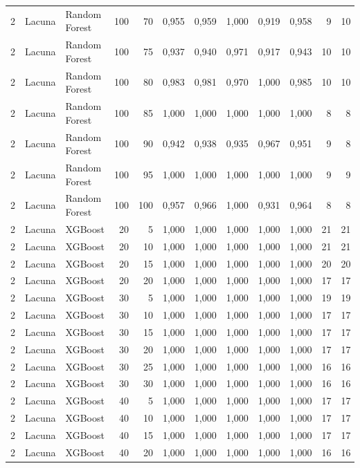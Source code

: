 \begin{longtable}{@{}rllrrrrrrrrr@{}}
2 & Lacuna & Random Forest & 100 & 70 & 0,955 & 0,959 & 1,000 & 0,919 & 0,958 & 9 & 10 \\
2 & Lacuna & Random Forest & 100 & 75 & 0,937 & 0,940 & 0,971 & 0,917 & 0,943 & 10 & 10 \\
2 & Lacuna & Random Forest & 100 & 80 & 0,983 & 0,981 & 0,970 & 1,000 & 0,985 & 10 & 10 \\
2 & Lacuna & Random Forest & 100 & 85 & 1,000 & 1,000 & 1,000 & 1,000 & 1,000 & 8 & 8 \\
2 & Lacuna & Random Forest & 100 & 90 & 0,942 & 0,938 & 0,935 & 0,967 & 0,951 & 9 & 8 \\
2 & Lacuna & Random Forest & 100 & 95 & 1,000 & 1,000 & 1,000 & 1,000 & 1,000 & 9 & 9 \\
2 & Lacuna & Random Forest & 100 & 100 & 0,957 & 0,966 & 1,000 & 0,931 & 0,964 & 8 & 8 \\
2 & Lacuna & XGBoost & 20 & 5 & 1,000 & 1,000 & 1,000 & 1,000 & 1,000 & 21 & 21 \\
2 & Lacuna & XGBoost & 20 & 10 & 1,000 & 1,000 & 1,000 & 1,000 & 1,000 & 21 & 21 \\
2 & Lacuna & XGBoost & 20 & 15 & 1,000 & 1,000 & 1,000 & 1,000 & 1,000 & 20 & 20 \\
2 & Lacuna & XGBoost & 20 & 20 & 1,000 & 1,000 & 1,000 & 1,000 & 1,000 & 17 & 17 \\
2 & Lacuna & XGBoost & 30 & 5 & 1,000 & 1,000 & 1,000 & 1,000 & 1,000 & 19 & 19 \\
2 & Lacuna & XGBoost & 30 & 10 & 1,000 & 1,000 & 1,000 & 1,000 & 1,000 & 17 & 17 \\
2 & Lacuna & XGBoost & 30 & 15 & 1,000 & 1,000 & 1,000 & 1,000 & 1,000 & 17 & 17 \\
2 & Lacuna & XGBoost & 30 & 20 & 1,000 & 1,000 & 1,000 & 1,000 & 1,000 & 17 & 17 \\
2 & Lacuna & XGBoost & 30 & 25 & 1,000 & 1,000 & 1,000 & 1,000 & 1,000 & 16 & 16 \\
2 & Lacuna & XGBoost & 30 & 30 & 1,000 & 1,000 & 1,000 & 1,000 & 1,000 & 16 & 16 \\
2 & Lacuna & XGBoost & 40 & 5 & 1,000 & 1,000 & 1,000 & 1,000 & 1,000 & 17 & 17 \\
2 & Lacuna & XGBoost & 40 & 10 & 1,000 & 1,000 & 1,000 & 1,000 & 1,000 & 17 & 17 \\
2 & Lacuna & XGBoost & 40 & 15 & 1,000 & 1,000 & 1,000 & 1,000 & 1,000 & 17 & 17 \\
2 & Lacuna & XGBoost & 40 & 20 & 1,000 & 1,000 & 1,000 & 1,000 & 1,000 & 16 & 16 \\

\end{longtable}
